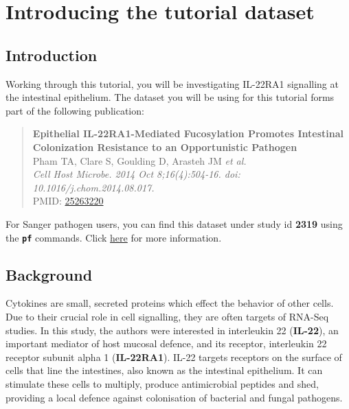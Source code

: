 \documentclass[11pt]{article}
\begin{document}



\newpage






    \hypertarget{introducing-the-tutorial-dataset}{%
\section{Introducing the tutorial
dataset}\label{introducing-the-tutorial-dataset}}

    \hypertarget{introduction}{%
\subsection{Introduction}\label{introduction}}

Working through this tutorial, you will be investigating IL-22RA1
signalling at the intestinal epithelium. The dataset you will be using
for this tutorial forms part of the following publication:

\begin{quote}
\textbf{Epithelial IL-22RA1-Mediated Fucosylation Promotes Intestinal
Colonization Resistance to an Opportunistic Pathogen}\\
Pham TA, Clare S, Goulding D, Arasteh JM \textit{et al.}\\
\textit{Cell Host Microbe. 2014 Oct 8;16(4):504-16. doi:
10.1016/j.chom.2014.08.017.}\\
PMID: \href{https://www.ncbi.nlm.nih.gov/pubmed/25263220}{25263220}
\end{quote}

For Sanger pathogen users, you can find this dataset under study id
\textbf{2319} using the \textbf{\texttt{pf}} commands. Click
\href{http://mediawiki.internal.sanger.ac.uk/index.php/Pathogen_Informatics_Command_Line_Scripts}{here}
for more information.

\hypertarget{background}{%
\subsection{Background}\label{background}}

Cytokines are small, secreted proteins which effect the behavior of
other cells. Due to their crucial role in cell signalling, they are
often targets of RNA-Seq studies. In this study, the authors were
interested in interleukin 22 (\textbf{IL-22}), an important mediator of
host mucosal defence, and its receptor, interleukin 22 receptor subunit
alpha 1 (\textbf{IL-22RA1}). IL-22 targets receptors on the surface of
cells that line the intestines, also known as the intestinal epithelium.
It can stimulate these cells to multiply, produce antimicrobial peptides
and shed, providing a local defence against colonisation of bacterial
and fungal pathogens.
\end{document}
